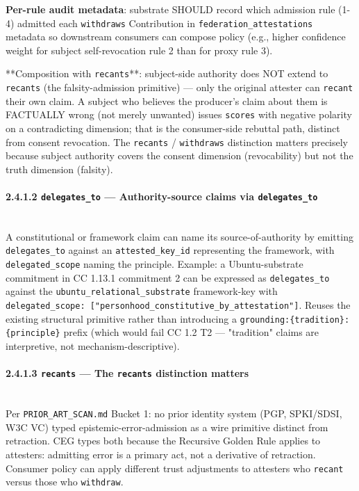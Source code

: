 \documentclass[11pt]{article}
\begin{document}
\textbf{Per-rule audit metadata}: substrate SHOULD record which admission rule (1-4) admitted each \texttt{withdraws} Contribution in \texttt{federation\_attestations} metadata so downstream consumers can compose policy (e.g., higher confidence weight for subject self-revocation rule 2 than for proxy rule 3).


**Composition with \texttt{recants}**: subject-side authority does NOT extend to \texttt{recants} (the falsity-admission primitive) — only the original attester can \texttt{recant} their own claim. A subject who believes the producer's claim about them is FACTUALLY wrong (not merely unwanted) issues \texttt{scores} with negative polarity on a contradicting dimension; that is the consumer-side rebuttal path, distinct from consent revocation. The \texttt{recants} / \texttt{withdraws} distinction matters precisely because subject authority covers the consent dimension (revocability) but not the truth dimension (falsity).


\paragraph{2.4.1.2 \texttt{delegates\_to} — Authority-source claims via \texttt{delegates\_to}}\mbox{}\\


A constitutional or framework claim can name its source-of-authority by emitting \texttt{delegates\_to} against an \texttt{attested\_key\_id} representing the framework, with \texttt{delegated\_scope} naming the principle. Example: a Ubuntu-substrate commitment in CC 1.13.1 commitment 2 can be expressed as \texttt{delegates\_to} against the \texttt{ubuntu\_relational\_substrate} framework-key with \texttt{delegated\_scope: ["personhood\_constitutive\_by\_attestation"]}. Reuses the existing structural primitive rather than introducing a \texttt{grounding:\{tradition\}:\{principle\}} prefix (which would fail CC 1.2 T2 — "tradition" claims are interpretive, not mechanism-descriptive).


\paragraph{2.4.1.3 \texttt{recants} — The \texttt{recants} distinction matters}\mbox{}\\


Per \texttt{PRIOR\_ART\_SCAN.md} Bucket 1: no prior identity system (PGP, SPKI/SDSI, W3C VC) typed epistemic-error-admission as a wire primitive distinct from retraction. CEG types both because the Recursive Golden Rule applies to attesters: admitting error is a primary act, not a derivative of retraction. Consumer policy can apply different trust adjustments to attesters who \texttt{recant} versus those who \texttt{withdraw}.
\end{document}
